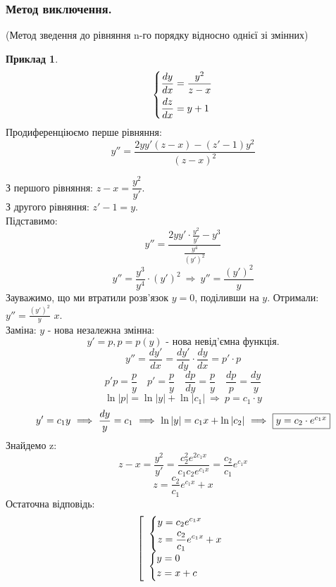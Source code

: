 \documentclass[14pt,a4paper]{scrartcl}
\theoremstyle{definition}
\newtheorem*{example}{Приклад}
\theoremstyle{definition}
\theoremstyle{definition}
\begin{document}
\subsubsection{Метод виключення.} (Метод зведення до рівняння n-го порядку відносно однієї зі змінних)
\begin{example}
$$ \begin{dcases}
 \frac{dy}{dx} = \frac{y^2}{z-x}\\
 \frac{dz}{dx} = y+1
 \end{dcases}$$
 Продиференціюємо перше рівняння:
 $$
 y'' = \frac{2yy'(z-x) - (z' - 1)y^2}{(z-x)^2}
 $$
\end{example}
 З першого рівняння: $z-x = \dfrac{y^2}{y'} $.\\
З другого рівняння: $z' - 1 = y$.\\
Підставимо:
$$
y'' = \frac{2yy' \cdot \frac{y^2}{y'} -y^3}{ \frac{y^4}{(y')^{2}} }
$$
$$
y'' = \frac{y^3}{y^4} \cdot (y')^{2} \ \Longrightarrow \  y'' = \frac{(y')^{2}}{y}
$$
Зауважимо, що ми втратили розв'язок $y=0$, поділивши на $y$. Отримали:\\ $y'' = \frac{(y')^2}{y} $  $x$.\\
Заміна: $y$ - нова незалежна змінна:
$$
y' = p, p = p(y) \text{ - нова невід'ємна функція.}
$$
$$
y'' = \frac{dy'}{dx} = \frac{dy'}{dy} \cdot \frac{dy}{dx} = p' \cdot p
$$
$$
p'p = \frac{p}{y} \quad p' = \frac{p}{y} \quad \frac{dp}{dy} = \frac{p}{y} \quad \frac{dp}{p} = \frac{dy}{y}
$$
$$
\ln \left| p \right| = \ln |y| + \ln |c_1| \ \Longrightarrow \  p = c_1 \cdot y
$$
$$
y' = c_1 y \ \Longrightarrow \  \frac{dy}{y} = c_1 \ \Longrightarrow \ \ln|y| = c_1 x + \ln|c_2| \ \Longrightarrow \  \fbox{$y = c_2 \cdot e^{c_1 x}$}
$$
Знайдемо z:
$$
z - x = \frac{y^2}{y'} = \frac{c_2^2 e^{2c_1 x}}{c_1 c_2 e^{c_1 x}} = \frac{c_2}{c_1} e^{c_1 x}
$$
$$
z  = \frac{c_2}{c_1} e^{c_1 x}   +x
$$
Остаточна відповідь:
$$
\left[
\begin{array}{l}
\begin{dcases}
 y = c_2 e^{c_1 x}\\
 z = \frac{c_2}{c_1} e^{c_1 x} + x
\end{dcases}
\\
\begin{dcases}
 y = 0\\
 z = x + c
\end{dcases}
\end{array}
 \right.
$$
\end{document}
